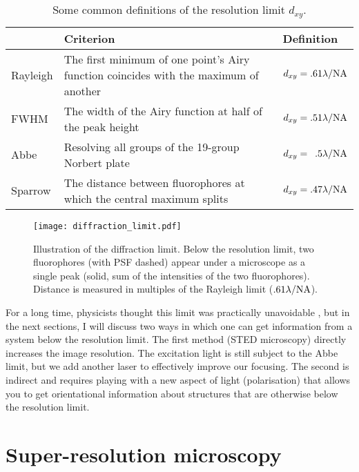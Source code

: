 \begin{table}
	\centering
	\begin{tabularx}{\linewidth}{lXl}
		\toprule
		         & Criterion                                                                            & Definition                            \\ \midrule
		Rayleigh & The first minimum of one point's Airy function coincides with the maximum of another & $ d_{xy} = .61\lambda/\mathrm{NA} $           \\
		FWHM     & The width of the Airy function at half of the peak height                            & $ d_{xy} = .51\lambda/\mathrm{NA} $           \\
		Abbe     & Resolving all groups of the 19-group Norbert plate \cite{Abbe1873, Norbert}                                  & $ d_{xy} = \phantom{1}.5\lambda/\mathrm{NA} $ \\
		Sparrow  & The distance between fluorophores at which the central maximum splits                & $ d_{xy} = .47 \lambda/\mathrm{NA} $          \\ \bottomrule
	\end{tabularx}
	\caption{Some common definitions of the resolution limit $ d_{xy} $.}
	\label{tab:resolution limits}
\end{table}
\begin{figure}
	\centering
	\texttt{[image: diffraction\_limit.pdf]}
	\caption{
		Illustration of the diffraction limit. Below the resolution limit, two fluorophores (with PSF dashed) appear under a microscope as a single peak (solid, sum of the intensities of the two fluorophores). Distance is measured in multiples of the Rayleigh limit ($ .61\lambda/\mathrm{NA} $).
	}
	\label{fig:diffraction limit}
\end{figure}

For a long time, physicists thought this limit was practically unavoidable \cite{McCutchen1967}, but in the next sections, I will discuss two ways in which one can get information from a system below the resolution limit. The first method (STED microscopy) directly increases the image resolution. The excitation light is still subject to the Abbe limit, but we add another laser to effectively improve our focusing. The second is indirect and requires playing with a new aspect of light (polarisation) that allows you to get orientational information about structures that are otherwise below the resolution limit.

\section{Super-resolution microscopy}

